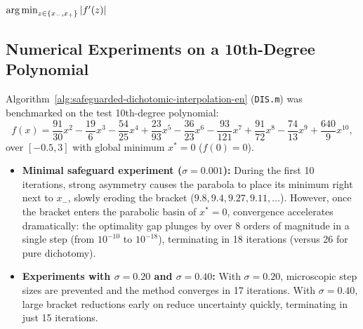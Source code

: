 \begin{algorithm}[htbp]
\caption{Safeguarded Dichotomic Quadratic Interpolation ($\sigma$-DIS)}
\label{alg:safeguarded-dichotomic-interpolation-en}
\KwInput{Function $f$, bracket $[x_-, x_+]$ with $f'(x_-) \le 0 \le f'(x_+)$, tolerances $\varepsilon, \delta > 0$, parameter $\sigma \in (0, 0.5]$}
\BlankLine
{}
\Return $\operatorname*{arg\,min}_{z \in \{x_-, x_+\}} |f'(z)|$\;
\end{algorithm}

\subsection{Numerical Experiments on a 10th-Degree Polynomial}
Algorithm~\ref{alg:safeguarded-dichotomic-interpolation-en} (\texttt{DIS.m}) was benchmarked on the test 10th-degree polynomial:
\begin{equation}
    f(x) = \frac{91}{30} x^2 - \frac{19}{6} x^3 - \frac{54}{25} x^4 + \frac{23}{93} x^5 - \frac{36}{23} x^6 - \frac{93}{121} x^7 + \frac{91}{72} x^8 - \frac{74}{13} x^9 + \frac{640}{9} x^{10},
    \label{eq:tenth-degree-polynomial-en}
\end{equation}
over $[-0.5, 3]$ with global minimum $x^* = 0$ ($f(0) = 0$).

\begin{itemize}
    \item \textbf{Minimal safeguard experiment ($\sigma = 0.001$):} During the first 10 iterations, strong asymmetry causes the parabola to place its minimum right next to $x_-$, slowly eroding the bracket ($9.8, 9.4, 9.27, 9.11, \dots$). However, once the bracket enters the parabolic basin of $x^* = 0$, convergence accelerates dramatically: the optimality gap plunges by over 8 orders of magnitude in a single step (from $10^{-10}$ to $10^{-18}$), terminating in 18 iterations (versus 26 for pure dichotomy).
    \item \textbf{Experiments with $\sigma = 0.20$ and $\sigma = 0.40$:} With $\sigma = 0.20$, microscopic step sizes are prevented and the method converges in 17 iterations. With $\sigma = 0.40$, large bracket reductions early on reduce uncertainty quickly, terminating in just 15 iterations.
\end{itemize}

